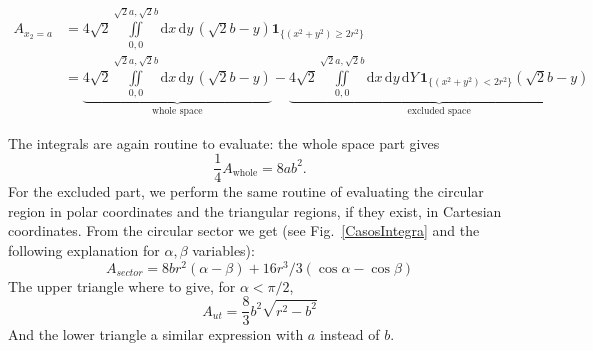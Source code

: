\documentclass[superscriptaddress,pre,reprint,showpacs,twocolumn]{revtex4-1}
\newcommand{\rd}[1]{\mathrm{d}{#1} \,}
\newcommand{\indicatorsymbol}{\mathbf{1}}
\newcommand{\indicator}[1]{\indicatorsymbol_{ \{   #1 \} } }
\begin{document}
    \begin{widetext}
    \begin{align}
      A_{x_2=a} & =4\sqrt{2}\iint \limits_{0,0}^{\sqrt{2}a,\sqrt{2}b}
        \rd x \rd y (\sqrt{2} b - y)
        \indicator{(x^2+y^2) \geq 2 r^2}\\
     &=\underbrace{4\sqrt{2}\iint \limits _{0,0}^{\sqrt{2}a,\sqrt{2}b}
        \rd x \rd y (\sqrt{2} b - y)}_{\text{whole space}}
        -\underbrace{
          4\sqrt{2}\iint \limits_{0,0}^{\sqrt{2}a,\sqrt{2}b}
        \rd x \rd y \rd Y 
        \indicator{(x^2+y^2) < 2 r^2}(\sqrt{2} b - y)}_{\text{excluded space}}
    \end{align}
    \end{widetext}
    The integrals are again routine to evaluate: the whole space part
    gives
    \begin{equation}
      \frac{1}{4}A_{\text{whole}}=8ab^2.
    \end{equation}
    For the excluded part, we perform the same routine of evaluating the circular region
    in polar coordinates and the triangular regions, if they exist, in Cartesian coordinates.
    From the circular sector we get (see Fig.~\ref{CasosIntegra} and the following explanation
    for $\alpha, \beta$ variables):
    \begin{equation}
      A_{sector}=8 b r^2(\alpha-\beta)+16r^3/3(\cos\alpha - \cos\beta)
    \end{equation}
    The upper triangle where to give, for $\alpha < \pi/2$,
    \begin{equation}
    A_{ut}=\frac{8}{3}b^2\sqrt{r^2-b^2}
    \end{equation}
    And the lower triangle a similar expression with $a$ instead of $b$.


\end{document}
